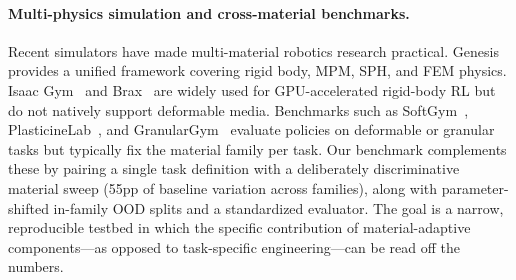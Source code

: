 \paragraph{Multi-physics simulation and cross-material benchmarks.}
Recent simulators have made multi-material robotics research practical. Genesis~\cite{genesis2024} provides a unified framework covering rigid body, MPM, SPH, and FEM physics. Isaac Gym~\cite{makoviychuk2021isaac} and Brax~\cite{freeman2021brax} are widely used for GPU-accelerated rigid-body RL but do not natively support deformable media. Benchmarks such as SoftGym~\cite{lin2021softgym}, PlasticineLab~\cite{huang2022plasticinelab}, and GranularGym~\cite{millard2023granulargym} evaluate policies on deformable or granular tasks but typically fix the material family per task. Our benchmark complements these by pairing a single task definition with a deliberately discriminative material sweep (55pp of baseline variation across families), along with parameter-shifted in-family OOD splits and a standardized evaluator. The goal is a narrow, reproducible testbed in which the specific contribution of material-adaptive components---as opposed to task-specific engineering---can be read off the numbers.
